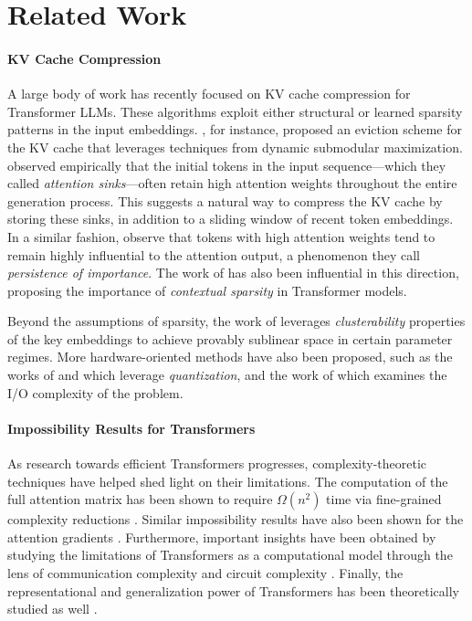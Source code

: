 \section{Related Work}
\paragraph{KV Cache Compression}
A large body of work has recently focused on KV cache compression for Transformer LLMs. 
%
These algorithms exploit either structural or learned sparsity patterns in the input embeddings.
%
\citet{Zhang2023}, for instance, proposed an eviction scheme for the KV cache that leverages techniques from dynamic submodular maximization. 
%
\citet{xiaoefficient} observed empirically that the initial tokens in the input sequence---which they called \textit{attention sinks}---often retain high attention weights throughout the entire generation process. 
%
This suggests a natural way to compress the KV cache by storing these sinks, in addition to a sliding window of recent token embeddings. 
%
In a similar fashion, \citet{liu2023scissorhands} observe that tokens with high attention weights tend to remain highly influential to the attention output, a phenomenon they call \textit{persistence of importance}. 
%
The work of \citet{liu2023deja} has also been influential in this direction, proposing the importance of \textit{contextual sparsity} in Transformer models. 

Beyond the assumptions of sparsity, the work of \citet{Zandieh2024} leverages \textit{clusterability} properties of the key embeddings to achieve provably sublinear space in certain parameter regimes. 
%
More hardware-oriented methods have also been proposed, such as the works of \citet{Duanmu2024} and \citet{zandieh2024qjl} which leverage \textit{quantization}, and the work of \citet{Jin2024} which examines the I/O complexity of the problem.

\paragraph{Impossibility Results for Transformers}
As research towards efficient Transformers progresses, complexity-theoretic techniques have helped shed light on their limitations.
%
The computation of the full attention matrix has been shown to require $\Omega(n^2)$ time via fine-grained complexity reductions \citep{Keles2022,alman2024fast}. 
%
Similar impossibility results have also been shown for the attention gradients \citep{alman2024fine}.
% 
Furthermore, important insights have been obtained by studying the limitations of Transformers as a computational model through the lens of communication complexity and circuit complexity \citep{alman2024fundamental,chen2024circuit}. 
%
Finally, the representational and generalization power of Transformers has been theoretically studied as well \citep{sanford2024transformers,sanford2024representational,li2023transformers}.